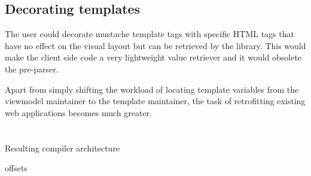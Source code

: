 \subsection{Decorating templates}

The user could decorate mustache template tags with specific HTML tags that
have no effect on the visual layout but can be retrieved by the library.
This would make the client side code a very lightweight value retriever
and it would obsolete the pre-parser.

Apart from simply shifting the workload of locating template variables
from the viewmodel maintainer to the template maintainer, the task of
retrofitting existing web applications becomes much greater.

\section{}



Resulting compiler architecture

offsets
